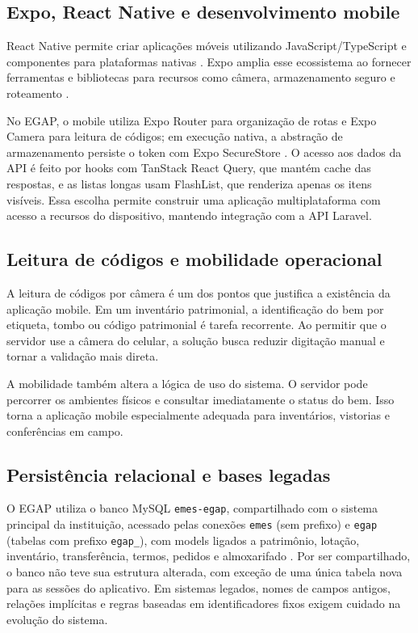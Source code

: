 \documentclass[12pt,a4paper]{article}
\begin{document}
\subsection{Expo, React Native e desenvolvimento mobile}

React Native permite criar aplicações móveis utilizando JavaScript/TypeScript e componentes para plataformas nativas \cite{react-native}. Expo amplia esse ecossistema ao fornecer ferramentas e bibliotecas para recursos como câmera, armazenamento seguro e roteamento \cite{expo}.

No EGAP, o mobile utiliza Expo Router para organização de rotas e Expo Camera para leitura de códigos; em execução nativa, a abstração de armazenamento persiste o token com Expo SecureStore \cite{expo-router,expo-camera,expo-securestore}. O acesso aos dados da API é feito por hooks com TanStack React Query, que mantém cache das respostas, e as listas longas usam FlashList, que renderiza apenas os itens visíveis. Essa escolha permite construir uma aplicação multiplataforma com acesso a recursos do dispositivo, mantendo integração com a API Laravel.

\subsection{Leitura de códigos e mobilidade operacional}

A leitura de códigos por câmera é um dos pontos que justifica a existência da aplicação mobile. Em um inventário patrimonial, a identificação do bem por etiqueta, tombo ou código patrimonial é tarefa recorrente. Ao permitir que o servidor use a câmera do celular, a solução busca reduzir digitação manual e tornar a validação mais direta.

A mobilidade também altera a lógica de uso do sistema. O servidor pode percorrer os ambientes físicos e consultar imediatamente o status do bem. Isso torna a aplicação mobile especialmente adequada para inventários, vistorias e conferências em campo.

\subsection{Persistência relacional e bases legadas}

O EGAP utiliza o banco MySQL \texttt{emes-egap}, compartilhado com o sistema principal da instituição, acessado pelas conexões \texttt{emes} (sem prefixo) e \texttt{egap} (tabelas com prefixo \texttt{egap\_}), com models ligados a patrimônio, lotação, inventário, transferência, termos, pedidos e almoxarifado \cite{egap-repo,mysql}. Por ser compartilhado, o banco não teve sua estrutura alterada, com exceção de uma única tabela nova para as sessões do aplicativo. Em sistemas legados, nomes de campos antigos, relações implícitas e regras baseadas em identificadores fixos exigem cuidado na evolução do sistema.
\end{document}
